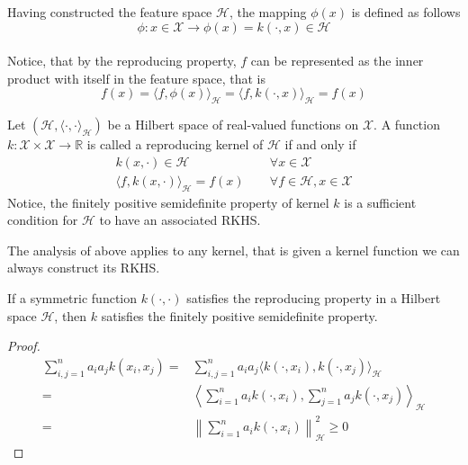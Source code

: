 Having constructed the feature space $\mathcal{H}$, the mapping $\phi(x)$ is defined as follows
\\
\begin{equation}
    \phi: x \in \mathcal{X} \to \phi(x)=k(\cdot, x) \in \mathcal{H}
\end{equation}
\\
Notice, that by the reproducing property, $f$ can be represented as the inner product with itself in the feature space, that is 
\begin{equation}
    f(x)=\langle f, \phi(x)\rangle_{\mathcal{H}}=\langle f, k(\cdot, x)\rangle_{\mathcal{H}}=f(x)
\end{equation}

\begin{definition}
    Let $(\mathcal{H}, \langle \cdot, \cdot \rangle_\mathcal{H})$ be a Hilbert space of real-valued functions on $\mathcal{X}$. A function $k: \mathcal{X} \times \mathcal{X} \to \mathbb{R}$ is called a reproducing kernel of $\mathcal{H}$ if and only if 
     \begin{align}
        k(x, \cdot) \in \mathcal{H} &\quad \ \forall x \in \mathcal{X}    \\
        \langle  f, k(x, \cdot) \rangle_\mathcal{H} = f(x) &\quad \ \forall f\in \mathcal{H}, x \in \mathcal{X}
    \end{align}
    Notice, the finitely positive semidefinite property of kernel $k$ is a sufficient condition for $\mathcal{H}$ to have an associated RKHS.
\end{definition}

The analysis of above applies to any kernel, that is given a kernel function we can always construct its RKHS.
\begin{theorem}
    If a symmetric function $k(\cdot, \cdot)$ satisfies the reproducing property in a Hilbert space $\mathcal{H}$, then $k$ satisfies the finitely positive semidefinite property.
\end{theorem}

\begin{proof}
    \begin{align}
        \sum\limits_{i,j=1}^n a_i a_j k(x_i, x_j)=& \sum\limits_{i,j=1}^n a_i a_j \langle k(\cdot, x_i), k(\cdot, x_j)\rangle_{\mathcal{H}}
        \\
        =& \left\langle \sum\limits_{i=1}^n a_i k(\cdot, x_i), \sum\limits_{j=1}^n a_j k(\cdot, x_j) \right\rangle_{\mathcal{H}} \\
        =& \left\| \sum\limits_{i=1}^n a_i k(\cdot, x_i)\right\|_{\mathcal{H}}^2 \geq 0
    \end{align}
\end{proof}
   
